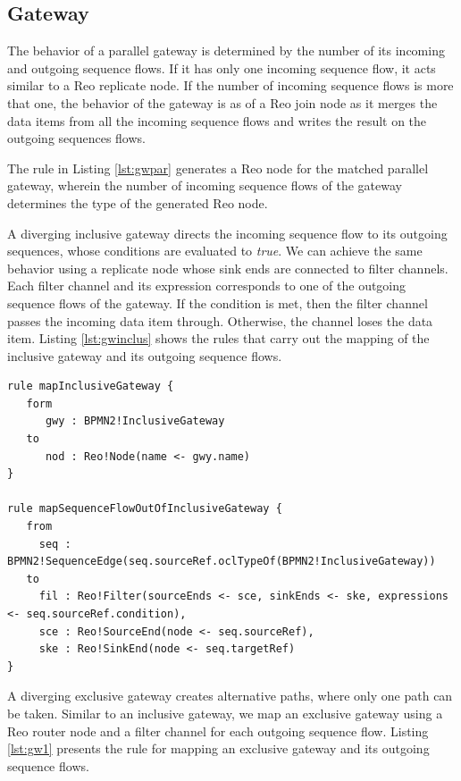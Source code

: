 \subsection{Gateway}
The behavior of a {parallel gateway} is determined by the number of its incoming and outgoing sequence flows. If it has only one {incoming sequence flow}, it acts similar to a Reo {replicate} node. If the number of {incoming sequence flows} is more that one, the behavior of the gateway is as of a Reo {join} node as it merges the data items from all the incoming sequence flows and writes the result on the {outgoing sequences flow}s. 

The rule in Listing \ref{lst:gwpar} generates a Reo {node} for the matched {parallel gateway}, wherein the number of incoming {sequence flows} of the gateway determines the type of the generated Reo {node}.

A diverging {inclusive gateway} directs the incoming sequence flow to its outgoing sequences, whose conditions are evaluated to \emph{true}. We can achieve the same behavior using a {replicate} node whose {sink end}s are connected to {filter} channels. Each {filter} channel and its {expression} corresponds to one of the outgoing sequence flows of the gateway. If the condition is met, then the {filter} channel passes the incoming data item through. Otherwise,  the channel loses the data item. Listing \ref{lst:gwinclus} shows the rules that carry out the mapping of the {inclusive gateway} and its outgoing sequence flows.

\begin{lstlisting}[float,frame=single,caption=Mapping inclusive gateway,label=lst:gwinclus]
rule mapInclusiveGateway {
   form
      gwy : BPMN2!InclusiveGateway
   to
      nod : Reo!Node(name <- gwy.name)
}

rule mapSequenceFlowOutOfInclusiveGateway {
   from
     seq : BPMN2!SequenceEdge(seq.sourceRef.oclTypeOf(BPMN2!InclusiveGateway))
   to
     fil : Reo!Filter(sourceEnds <- sce, sinkEnds <- ske, expressions <- seq.sourceRef.condition),
     sce : Reo!SourceEnd(node <- seq.sourceRef),
     ske : Reo!SinkEnd(node <- seq.targetRef)
}
\end{lstlisting}

A diverging {exclusive gateway} creates alternative paths, where only one path can be taken. Similar to an {inclusive gateway}, we map an exclusive gateway using a Reo {router} node and a {filter channel} for each outgoing sequence flow. %
 Listing \ref{lst:gw1} presents the rule for mapping an {exclusive gateway} and its outgoing sequence flows.

